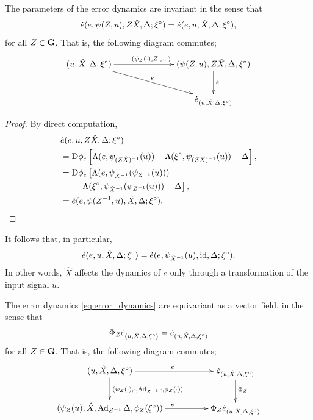 \documentclass{article}
\begin{document}
\begin{proposition}
The parameters of the error dynamics are invariant in the sense that
\begin{align*}
    \dot{e}(e, \psi(Z, u), Z\hat{X}, \Delta; {\xi}^\circ)
    = \dot{e}(e, u, \hat{X}, \Delta; {\xi}^\circ),
\end{align*}
for all $Z \in \mathbf{G}$.
That is, the following diagram commutes;
\[
\xymatrixcolsep{70pt}\xymatrix{
(u, \hat{X}, \Delta, \mr{\xi})
\ar[r]^{(\psi_Z(\cdot), Z \cdot, \cdot, \cdot)}
\ar[rd]^{\dot{e}}
&
(\psi(Z, u), Z\hat{X}, \Delta, \mr{\xi})
\ar[d]^{\dot{e}}
\\
&
\dot{e}_{(u, \hat{X}, \Delta, \mr{\xi})}
}
\]
\end{proposition}

\begin{proof}
By direct computation,
\begin{align*}
    &\dot{e}(e, u, Z \hat{X}, \Delta; {\xi}^\circ) \\
    &= \mathrm{D} \phi_e
    \left[\Lambda(e, \psi_{(Z\hat{X})^{-1}}(u))
    - \Lambda({\xi}^\circ, \psi_{(Z\hat{X})^{-1}}(u)) - \Delta\right], \\
    &= \mathrm{D} \phi_e \left[\Lambda(e, \psi_{\hat{X}^{-1}}(\psi_{Z^{-1}}(u)))
    \right. \\ &\phantom{==} \left.
    - \Lambda({\xi}^\circ, \psi_{\hat{X}^{-1}}(\psi_{Z^{-1}}(u))) - \Delta\right], \\
    &= \dot{e}(e, \psi(Z^{-1}, u), \hat{X}, \Delta; {\xi}^\circ).
\end{align*}
\end{proof}

It follows that, in particular,
\begin{align}
    \dot{e}(e, u, \hat{X}, \Delta; {\xi}^\circ)
    = \dot{e}(e, \psi_{\hat{X}^{-1}}(u), \mathrm{id}, \Delta; {\xi}^\circ).
\end{align}
In other words, $\hat{X}$ affects the dynamics of $e$ only through a transformation of the input signal $u$.

\begin{proposition} %
The error dynamics \eqref{eq:error_dynamics} are equivariant as a vector field, in the sense that
\begin{align*}
    \Phi_Z \dot{e}_{(u, \hat{X}, \Delta, {\xi}^\circ)}
    = \dot{e}_{(u, \hat{X}, \Delta, {\xi}^\circ)}
\end{align*}
for all $Z \in \mathbf{G}$.
That is, the following diagram commutes;
\[
\xymatrixcolsep{50pt}\xymatrix{
(u, \hat{X}, \Delta, \mr{\xi})
\ar[d]^{(\psi_Z(\cdot), \cdot, \Ad_{Z^{-1}}\cdot, \phi_Z(\cdot))}
\ar[r]^{\dot{e}}
&
\dot{e}_{(u, \hat{X}, \Delta, \mr{\xi})}
\ar[d]^{\Phi_Z}
\\
(\psi_Z(u), \hat{X}, \Ad_{Z^{-1}} \Delta, \phi_Z(\mr{\xi}))
\ar[r]^{\dot{e}}
&
\Phi_Z \dot{e}_{(u, \hat{X}, \Delta, \mr{\xi})}
}
\]
\end{proposition}
\end{document}
